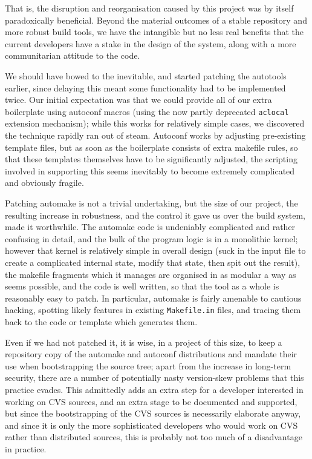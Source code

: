 \documentclass{speauth}
\begin{document}
That is, the disruption and reorganisation caused by this project was
by itself paradoxically beneficial.  Beyond the material outcomes of a
stable repository and more robust build tools, we have the intangible
but no less real benefits that the current developers have a stake in
the design of the system, along with a more communitarian attitude to
the code.

We should have bowed to the inevitable, and started patching the
autotools earlier, since delaying this meant some functionality had to
be implemented twice.  Our initial expectation was that we could
provide all of our extra boilerplate using autoconf macros (using the
now partly deprecated \texttt{aclocal} extension mechanism); while
this works for relatively simple cases, we discovered the technique
rapidly ran out of steam.  Autoconf
works by adjusting pre-existing template files, but as soon as the
boilerplate consists of extra makefile rules, so that these templates
themselves have to be significantly adjusted, the scripting involved
in supporting this seems inevitably to become extremely complicated
and obviously fragile.

Patching automake is not a trivial undertaking, but the size of our
project, the resulting increase in robustness, and the control it gave
us over the build system, made it worthwhile.  The automake code is
undeniably complicated and rather confusing in detail, and the bulk of
the program logic is in a monolithic kernel; however that kernel is
relatively simple in overall design (suck in the input file to create
a complicated internal state, modify that state, then spit out
the result), the makefile fragments which it manages are organised in
as modular a way as seems possible, and the code is well written, so
that the tool as a whole is reasonably easy to patch.  In particular,
automake is fairly amenable to cautious hacking, spotting likely
features in existing \texttt{Makefile.in} files, and tracing them back
to the code or template which generates them.

Even if we had not patched it, it is wise, in a project of this size,
to keep a repository copy of the automake and autoconf distributions
and mandate their use when bootstrapping the source tree; apart from
the increase in long-term security, there are a number of potentially
nasty version-skew problems that this practice evades.  This
admittedly adds an extra step for a developer interested in working on
CVS sources, and an extra stage to be documented and supported, but
since the bootstrapping of the CVS sources is necessarily elaborate
anyway, and since it is only the more sophisticated developers who
would work on CVS rather than distributed sources, this is probably
not too much of a disadvantage in practice.
\end{document}
